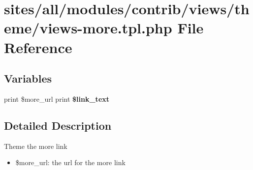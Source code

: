 \hypertarget{views-more_8tpl_8php}{
\section{sites/all/modules/contrib/views/theme/views-more.tpl.php File Reference}
\label{views-more_8tpl_8php}
}
\subsection*{Variables}
\begin{CompactItemize}
\item 
\hypertarget{views-more_8tpl_8php_d8e91f0b148a1a82b33776a9b908f09f}{
print \$more\_\-url print \textbf{\$link\_\-text}}
\label{views-more_8tpl_8php_d8e91f0b148a1a82b33776a9b908f09f}

\end{CompactItemize}


\subsection{Detailed Description}
Theme the more link

\begin{itemize}
\item \$more\_\-url: the url for the more link \end{itemize}
